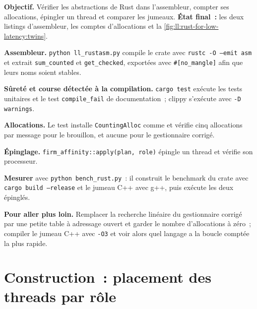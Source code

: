 \begin{tutorial}
\textbf{Objectif.} Vérifier les abstractions de Rust dans l'assembleur, compter ses allocations, épingler un thread et comparer les jumeaux.
\textbf{État final~:} les deux listings d'assembleur, les comptes d'allocations et la \cref{fig:ll:rust-for-low-latency:twins}.
\begin{tutsteps}
\item \textbf{Assembleur.} \texttt{python ll\_rustasm.py} compile le crate avec \texttt{rustc -O --emit asm} et extrait
\texttt{sum\_counted} et \texttt{get\_checked}, exportées avec \texttt{\#[no\_mangle]} afin que leurs noms soient stables.
\item \textbf{Sûreté et course détectée à la compilation.} \texttt{cargo test} exécute les tests unitaires et le test \texttt{compile\_fail}
de documentation~; clippy s'exécute avec \texttt{-D warnings}.
\item \textbf{Allocations.} Le test installe \texttt{CountingAlloc} comme  et vérifie cinq allocations
par message pour le brouillon, et aucune pour le gestionnaire corrigé.
\item \textbf{Épinglage.} \texttt{firm\_affinity::apply(plan, role)} épingle un thread et vérifie son processeur.
\item \textbf{Mesurer} avec \texttt{python bench\_rust.py}~: il construit le benchmark du crate avec
\texttt{cargo build --release} et le jumeau C++ avec g++, puis exécute les deux épinglés.
\end{tutsteps}
\textbf{Pour aller plus loin.} Remplacer la recherche linéaire du gestionnaire corrigé par une petite table à adressage ouvert et garder le
nombre d'allocations à zéro~; compiler le jumeau C++ avec \texttt{-O3} et voir alors quel langage a la boucle comptée la plus rapide.
\end{tutorial}

\section{Construction~: placement des threads par rôle}\label{bld:ll:rust-for-low-latency:affinity}

